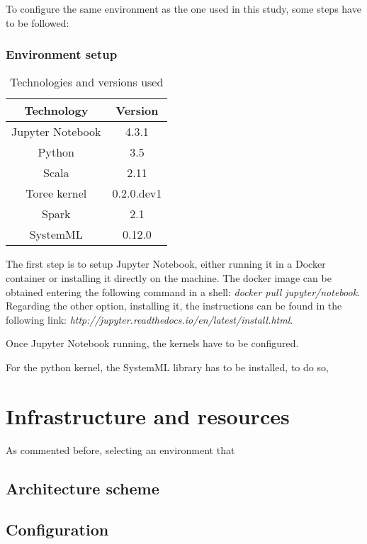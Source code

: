 \documentclass[11pt]{article} %
\begin{document}
To configure the same environment as the one used in this study, some steps have to be followed:

\subsubsection{Environment setup}


\begin{table}
\centering
\begin{tabular}{| c | c |}
\hline
Technology & Version \\ \hline
Jupyter Notebook & 4.3.1 \\ \hline
Python & 3.5 \\ \hline
Scala & 2.11 \\ \hline
Toree kernel & 0.2.0.dev1 \\ \hline
Spark & 2.1 \\ \hline
SystemML & 0.12.0 \\ \hline
\end{tabular}
\caption{Technologies and versions used}
\end{table}

The first step is to setup Jupyter Notebook, either running it in a Docker container or installing it directly on the machine. The docker image can be obtained entering the following command in a shell: \emph{docker pull jupyter/notebook}. Regarding the other option, installing it, the instructions can be found in the following link: \emph{http://jupyter.readthedocs.io/en/latest/install.html}.

Once Jupyter Notebook running, the kernels have to be configured.

For the python kernel, the SystemML library has to be installed, to do so,



\section{Infrastructure and resources}

As commented before, selecting an environment that

\subsection{Architecture scheme}

\subsection{Configuration}
\end{document}
